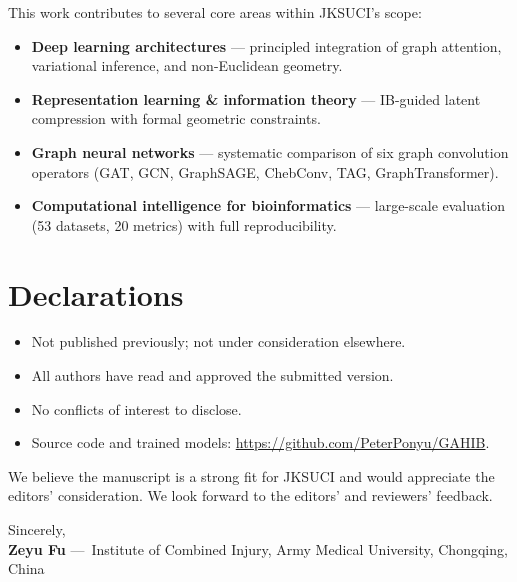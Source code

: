 \documentclass[11pt,a4paper]{article}
\newcommand{\journalShort}{JKSUCI}
\newcommand{\journalScope}{%
This work contributes to several core areas within \journalShort's scope:
\begin{itemize}[leftmargin=1.4em, itemsep=1pt, topsep=2pt]
  \item \textbf{Deep learning architectures} --- principled integration
    of graph attention, variational inference, and non-Euclidean geometry.
  \item \textbf{Representation learning \& information theory} ---
    IB-guided latent compression with formal geometric constraints.
  \item \textbf{Graph neural networks} --- systematic comparison of six
    graph convolution operators (GAT, GCN, GraphSAGE, ChebConv, TAG,
    GraphTransformer).
  \item \textbf{Computational intelligence for bioinformatics} ---
    large-scale evaluation (53 datasets, 20 metrics) with full
    reproducibility.
\end{itemize}%
}
\begin{document}
\journalScope

\section*{Declarations}

\begin{itemize}[leftmargin=1.4em, itemsep=1pt, topsep=2pt]
  \item Not published previously; not under consideration elsewhere.
  \item All authors have read and approved the submitted version.
  \item No conflicts of interest to disclose.
  \item Source code and trained models:
    \url{https://github.com/PeterPonyu/GAHIB}.
\end{itemize}

\vspace{4pt}

\noindent
We believe the manuscript is a strong fit for \journalShort{} and
would appreciate the editors' consideration. We look forward to
the editors' and reviewers' feedback.

\vspace{12pt}

\noindent
Sincerely,\\[10pt]
{\bfseries\color{accentblue} Zeyu Fu}\hspace{0.6em}%
{\small\color{darkgray}---\ Institute of Combined Injury,
  Army Medical University, Chongqing, China}
\end{document}
